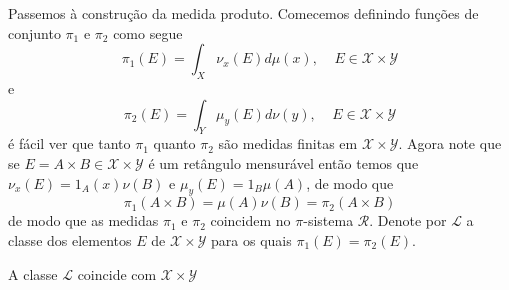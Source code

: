 \medskip


Passemos à construção da medida produto. Comecemos definindo funções de conjunto $\pi_1$ e $\pi_2$ como segue
\begin{equation}\label{M.Prod. 1}
\pi_1(E)=\int_X \nu_x(E) d\mu(x),~~~~~E \in \mathscr{X}\times \mathscr{Y}
\end{equation}
e 
\begin{equation}\label{M. Prod. 2}
\pi_2(E)=\int_Y \mu_y(E)d\nu(y),~~~~~E \in \mathscr{X}\times \mathscr{Y}
\end{equation}
é fácil ver que tanto $\pi_1$ quanto $\pi_2$ são medidas finitas em $\mathscr{X}\times \mathscr{Y}$. Agora note que se $E=A\times B\in\mathscr{X}\times \mathscr{Y}$  é um retângulo mensurável então temos que  $\nu_x(E)=1_A(x)\nu(B)$ e $\mu_y(E)=1_B\mu(A)$, de modo que 
\begin{equation}
\pi_1(A\times B)=\mu(A)\nu(B)=\pi_2(A\times B)
\end{equation}
de modo que as medidas $\pi_1$ e $\pi_2$ coincidem no $\pi$-sistema $\mathscr{R}$.  Denote por $\mathscr{L}$ a classe dos elementos $E$ de 
$\mathscr{X}\times \mathscr{Y}$  para os quais $\pi_1(E)=\pi_2(E)$.

\begin{proposicao}
A classe $\mathscr{L}$ coincide com $\mathscr{X}\times \mathscr{Y}$
\end{proposicao}


